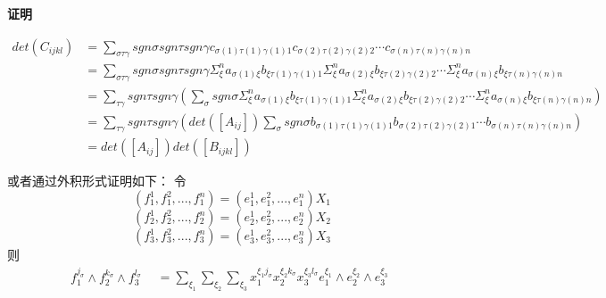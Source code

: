 \documentclass[twoside,a4paper,CCT]{cctart}   %
\begin{document}
{\bf 证明}\quad

\begin{align*}
det(C_{ijkl})&=\sum \limits_{\sigma\tau\gamma}sgn\sigma sgn\tau sgn\gamma c_{\sigma(1)\tau(1)\gamma(1)1} c_{\sigma(2)\tau(2)\gamma(2)2}\cdots c_{\sigma(n)\tau(n)\gamma(n)n}\\
&=\sum \limits_{\sigma\tau\gamma}sgn\sigma sgn\tau sgn\gamma \Sigma_{\xi}^{n}a_{\sigma(1)\xi}b_{\xi \tau(1)\gamma(1)1} \Sigma_{\xi}^{n}a_{\sigma(2)\xi}b_{\xi \tau(2)\gamma(2)2}\cdots \Sigma_{\xi}^{n}a_{\sigma(n)\xi}b_{\xi \tau(n)\gamma(n)n}\\
&=\sum \limits_{\tau\gamma}sgn\tau sgn\gamma(\sum \limits_{\sigma}sgn\sigma  \Sigma_{\xi}^{n}a_{\sigma(1)\xi}b_{\xi \tau(1)\gamma(1)1} \Sigma_{\xi}^{n}a_{\sigma(2)\xi}b_{\xi \tau(2)\gamma(2)2}\cdots \Sigma_{\xi}^{n}a_{\sigma(n)\xi}b_{\xi \tau(n)\gamma(n)n})\\
&=\sum \limits_{\tau\gamma}sgn\tau sgn\gamma(det([A_{ij}])\sum \limits_{\sigma}sgn\sigma b_{\sigma(1) \tau(1)\gamma(1)1} b_{\sigma(2) \tau(2)\gamma(2)1} \cdots b_{\sigma(n) \tau(n)\gamma(n)n})\\
&=det([A_{ij}])det([B_{ijkl}])
\end{align*}


或者通过外积形式证明如下：
令
$$(f_{1}^{1},f_{1}^{2},...,f_{1}^{n})=(e_{1}^{1},e_{1}^{2},...,e_{1}^{n})X_{1}$$
$$(f_{2}^{1},f_{2}^{2},...,f_{2}^{n})=(e_{2}^{1},e_{2}^{2},...,e_{2}^{n})X_{2}$$
$$(f_{3}^{1},f_{3}^{2},...,f_{3}^{n})=(e_{3}^{1},e_{3}^{2},...,e_{3}^{n})X_{3}$$
则
\begin{equation}
f_{1}^{j_{\sigma}}\wedge f_{2}^{k_{\sigma}}\wedge f_{3}^{l_{\sigma}}
\begin{aligned}
& = \sum_{\xi_{1}}\sum_{\xi_{2}}\sum_{\xi_{3}}x_{1}^{\xi_{1}j_{\sigma}}x_{2}^{\xi_{2}k_{\sigma}}x_{3}^{\xi_{
3}l_{\sigma}}e_{1}^{\xi_{1}}\wedge e_{2}^{\xi_{2}}\wedge e_{3}^{\xi_{3}}
\end{aligned}
\end{equation}
\end{document}
